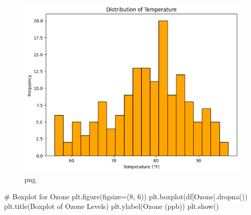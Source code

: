 \documentclass[
  letterpaper,
  DIV=11,
  numbers=noendperiod]{scrreprt}
\newenvironment{Shaded}{\begin{snugshade}}{\end{snugshade}}
\newcommand{\CommentTok}[1]{\textcolor[rgb]{0.37,0.37,0.37}{#1}}
\newcommand{\DecValTok}[1]{\textcolor[rgb]{0.68,0.00,0.00}{#1}}
\newcommand{\NormalTok}[1]{\textcolor[rgb]{0.00,0.23,0.31}{#1}}
\newcommand{\OperatorTok}[1]{\textcolor[rgb]{0.37,0.37,0.37}{#1}}
\newcommand{\StringTok}[1]{\textcolor[rgb]{0.13,0.47,0.30}{#1}}
\begin{document}
\begin{figure}[H]

{\centering \includegraphics{week4_baruga_python_files/week4_baruga_python_7_0.png}

}

\caption{png}

\end{figure}%

\begin{Shaded}
\begin{Highlighting}[]
\CommentTok{\# Boxplot for Ozone}
\NormalTok{plt.figure(figsize}\OperatorTok{=}\NormalTok{(}\DecValTok{8}\NormalTok{, }\DecValTok{6}\NormalTok{))}
\NormalTok{plt.boxplot(df[}\StringTok{\textquotesingle{}Ozone\textquotesingle{}}\NormalTok{].dropna())}
\NormalTok{plt.title(}\StringTok{\textquotesingle{}Boxplot of Ozone Levels\textquotesingle{}}\NormalTok{)}
\NormalTok{plt.ylabel(}\StringTok{\textquotesingle{}Ozone (ppb)\textquotesingle{}}\NormalTok{)}
\NormalTok{plt.show()}
\end{Highlighting}
\end{Shaded}
\end{document}
